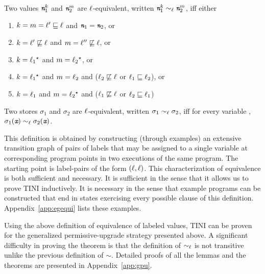 \begin{mydef}
\label{def:gpua:veq}
Two values $\emph{\texttt{n}}_1^k$ and $\emph{\texttt{n}}_2^m$ are
$\ell$-equivalent, written $\emph{\texttt{n}}_1^k \sim_\ell
\emph{\texttt{n}}_2^m$, iff either 
\begin{enumerate}
\item $k = m = \ell' \sqsubseteq \ell$ and $\emph{\texttt{n}}_1 =
  \emph{\texttt{n}}_2$, or 
\item $ k = \ell'
  \not\sqsubseteq \ell$ and $m = \ell'' \not\sqsubseteq \ell$, or 
\item $k = \ell_1{}^\star$ and $m = \ell_2{}^\star$, or
\item $k = \ell_1{}^\star$ and $m = \ell_2$ and ($\ell_2 \not\sqsubseteq
  \ell$ or $\ell_1 \sqsubseteq \ell_2 $), or
\item $k = \ell_1$ and $m = \ell_2{}^\star$ and ($\ell_1 \not\sqsubseteq
  \ell$ or $\ell_2 \sqsubseteq \ell_1$)
\end{enumerate}
\end{mydef}

\begin{mydef}
\label{def:gpua:seq}
  Two stores $\sigma_1$ and $\sigma_2$ are $\ell$-equivalent,
  written $\sigma_1 \sim_\ell \sigma_2$, iff for every variable \emph{},
  $\sigma_1(\emph{\texttt{x}}) \sim_\ell \sigma_2(\emph{\texttt{x}})$.
\end{mydef}

This definition is obtained by constructing (through examples) an
extensive transition graph of pairs of labels that may be assigned to
a single variable at corresponding program points in two executions of
the same program. The starting point is label-pairs of the form
$(\ell, \ell)$. This characterization of equivalence is both
sufficient and necessary. It is sufficient in the sense that it allows
us to prove TINI inductively. It is necessary in the sense that
example programs can be constructed that end in states exercising
every possible clause of this definition. Appendix~\ref{app:egequi}
lists these examples. 


Using the above definition of equivalence of labeled values, TINI can
be proven for the generalized permissive-upgrade strategy presented
above. A significant difficulty in proving the theorem is that the
definition of $\sim_\ell$ is not transitive unlike the previous definition
of $\sim$. 
Detailed proofs of all the lemmas and the theorems
are presented in Appendix~\ref{app:gpu}.

